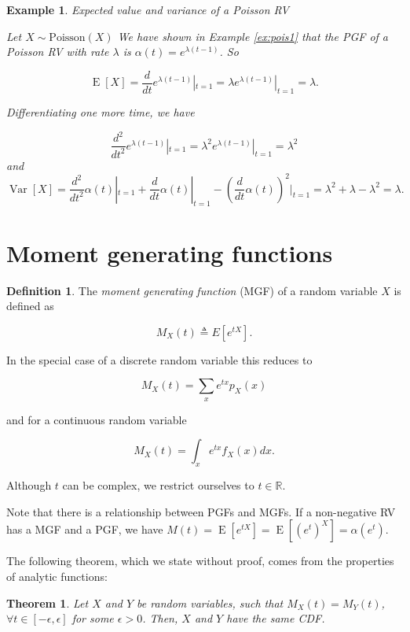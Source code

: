 \documentclass{book}
\theoremstyle{plain}%
\newtheorem{prototheorem}{Example}[section]
\newenvironment{cexample}
   {\colorlet{shadecolor}{gray!10}\begin{shaded}\begin{prototheorem}}
   {\end{prototheorem}\end{shaded}}
\newtheorem{theorem}{Theorem}[section]
\theoremstyle{definition}
\newtheorem{definition}{Definition}[section]
\DeclareMathOperator{\Var}{Var}
\DeclareMathOperator{\E}{E}
\begin{document}
\begin{cexample}{Expected value and variance of a Poisson RV}

Let $X \sim \text{Poisson}(X)$ We have shown in Example \ref{ex:pois1} that the PGF of a Poisson RV with rate $\lambda$ is $\alpha(t) = e^{\lambda(t - 1)}$. So

$$\E[X] = \frac{d}{dt} e^{\lambda(t - 1)} |_{t = 1} = \lambda e^{\lambda(t - 1)} |_{t = 1} = \lambda.$$

Differentiating one more time, we have

$$\frac{d^2}{dt^2} e^{\lambda(t - 1)} |_{t = 1} = \lambda^2 e^{\lambda(t - 1)} |_{t = 1} = \lambda^2$$
and 
$$\Var[X] = \frac{d^2}{dt^2}\alpha(t)|_{t=1} + \frac{d}{dt}\alpha(t)|_{t=1} - (\frac{d}{dt}\alpha(t))^2|_{t=1} = \lambda^2 + \lambda - \lambda^2 = \lambda.$$

\end{cexample}

\section{Moment generating functions}

\begin{definition}
The \textit{moment generating function} (MGF) of a random variable $X$ is defined as

$$M_X(t) \triangleq E[e^{tX}].$$

In the special case of a discrete random variable this reduces to

$$M_X(t) = \sum_x e^{tx}p_X(x)$$

and for a continuous random variable

$$M_X(t) = \int_x e^{tx}f_X(x)dx.$$
\end{definition}

Although $t$ can be complex, we restrict ourselves to $t \in \mathbb{R}$.

Note that there is a relationship between PGFs and MGFs. If a non-negative RV has a MGF and a PGF, we have $M(t) = \E[e^{tX}] = \E[(e^t)^X] = \alpha(e^t)$.

The following theorem, which we state without proof, comes from the properties of analytic functions:

\begin{theorem}
Let $X$ and $Y$ be random variables, such that $M_X(t) = M_Y(t)$, $\forall t \in [-\epsilon, \epsilon]$ for some $\epsilon > 0$. Then, $X$ and $Y$ have the same CDF.
\end{theorem}
\end{document}

